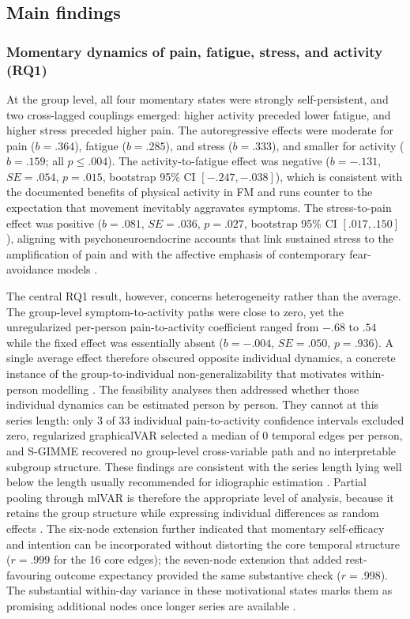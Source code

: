 \documentclass[11pt,a4paper]{article}
\begin{document}
\subsection{Main findings}

\subsubsection{Momentary dynamics of pain, fatigue, stress, and activity (RQ1)}
At the group level, all four momentary states were strongly self-persistent, and two
cross-lagged couplings emerged: higher activity preceded lower fatigue, and higher stress
preceded higher pain. The autoregressive effects were moderate for pain ($b=.364$), fatigue
($b=.285$), and stress ($b=.333$), and smaller for activity ($b=.159$; all $p\leq .004$).
The activity-to-fatigue effect was negative ($b=-.131$, $SE=.054$, $p=.015$, bootstrap 95\%
CI $[-.247, -.038]$), which is consistent with the documented benefits of physical activity
in FM \citep{busch2007exercise,geneen2017physical} and runs counter to the expectation that
movement inevitably aggravates symptoms. The stress-to-pain effect was positive ($b=.081$,
$SE=.036$, $p=.027$, bootstrap 95\% CI $[.017, .150]$), aligning with
psychoneuroendocrine accounts that link sustained stress to the amplification of pain
\citep{hannibal2014chronic} and with the affective emphasis of contemporary
fear-avoidance models \citep{crombez2012fear}.

The central RQ1 result, however, concerns heterogeneity rather than the average. The
group-level symptom-to-activity paths were close to zero, yet the unregularized per-person
pain-to-activity coefficient ranged from $-.68$ to $.54$ while the fixed effect was
essentially absent ($b=-.004$, $SE=.050$, $p=.936$). A single average effect therefore
obscured opposite individual dynamics, a concrete instance of the group-to-individual
non-generalizability that motivates within-person modelling
\citep{fisher2018lack,molenaar2004manifesto}. The feasibility analyses then addressed whether
those individual dynamics can be estimated person by person. They cannot at this series
length: only 3 of 33 individual pain-to-activity confidence intervals excluded zero,
regularized graphicalVAR selected a median of 0 temporal edges per person, and S-GIMME
recovered no group-level cross-variable path and no interpretable subgroup structure. These
findings are consistent with the series length lying well below the length usually
recommended for idiographic estimation \citep{beltz2016bridging}.
Partial pooling through mlVAR is therefore the appropriate level of analysis, because it
retains the group structure while expressing individual differences as random effects
\citep{epskamp2018gaussian,bringmann2013network}. The six-node extension further indicated that
momentary self-efficacy and intention can be incorporated without distorting the core temporal
structure ($r=.999$ for the 16 core edges); the seven-node extension that added
rest-favouring outcome expectancy provided the same substantive check ($r=.998$). The substantial
within-day variance in these motivational states marks them as promising additional nodes
once longer series are available \citep{schwarzer2008modeling,maes2022variability}.
\end{document}
